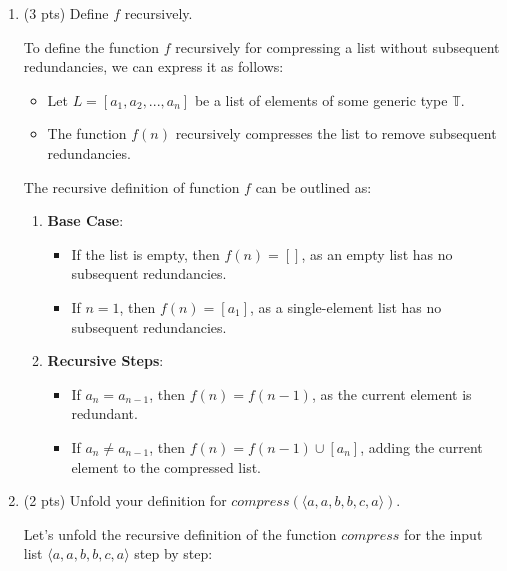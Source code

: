 \documentclass[12pt]{article}
\begin{document}
\begin{spacing}{1.5}
\begin{enumerate}
        \item (3 pts) Define $f$ recursively.

         To define the function $f$ recursively for compressing a list without subsequent redundancies, we can express it as follows: 

         \begin{itemize}
             \item Let $L = [a_1, a_2, ..., a_n]$ be a list of elements of some generic type $\mathbb{T}$.

             \item The function $f(n)$ recursively compresses the list to remove subsequent redundancies.
         \end{itemize}

        The recursive definition of function $f$ can be outlined as: 

        \begin{enumerate}
            \item \textbf{Base Case}: 
                \begin{itemize}
                    \item If the list is empty, then $f(n) = []$, as an empty list has no subsequent redundancies.
                    
                    \item If $n = 1$, then $f(n) = [a_1]$, as a single-element list has no subsequent redundancies.
                \end{itemize}

            \item \textbf{Recursive Steps}:
                \begin{itemize}
                    \item If $a_n = a_{n-1}$, then $f(n) = f(n-1)$, as the current element is redundant.

                    \item If $a_n \neq a_{n-1}$, then $f(n) = f(n-1) \cup [a_n]$, adding the current element to the compressed list.
                \end{itemize}
        \end{enumerate}

        \item (2 pts) Unfold your definition for $compress(\langle a, a, b, b, c, a \rangle)$.

        Let's unfold the recursive definition of the function $compress$ for the input list $\langle a, a, b, b, c, a \rangle$ step by step:


\end{enumerate}
\end{spacing}
\end{document}
